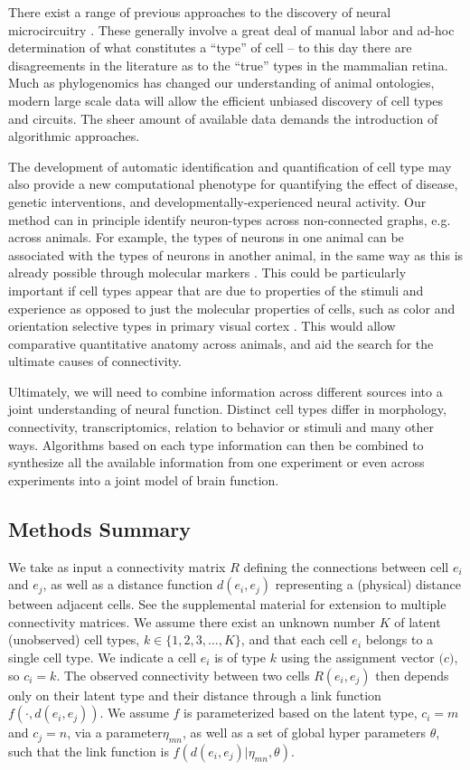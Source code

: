 \documentclass{article}
\renewcommand{\vec}[1]{\mathbf{#1}}
\begin{document}
There exist a range of previous approaches to the discovery of
neural microcircuitry . These
generally involve a great deal of manual labor and ad-hoc
determination of what constitutes a “type” of cell -- to this day
there are disagreements in the literature as to the “true” types in
the mammalian retina. Much as phylogenomics has changed our
understanding of animal ontologies, modern large scale data will allow
the efficient unbiased discovery of cell types and circuits. The sheer
amount of available data demands the introduction of algorithmic
approaches.

The development of automatic identification and quantification of cell
type may also provide a new computational phenotype for quantifying
the effect of disease, genetic interventions, and
developmentally-experienced neural activity. Our method can in
principle identify neuron-types across non-connected graphs,
e.g. across animals. For example, the types of neurons in one animal
can be associated with the types of neurons in another animal, in the
same way as this is already possible through molecular markers
\autocite{Brown2009}. This could be particularly important if cell
types appear that are due to properties of the stimuli and experience
as opposed to just the molecular properties of cells, such as color
and orientation selective types in primary visual cortex
\autocite{Sincich2005,Lennie2005}. This would allow comparative
quantitative anatomy across animals, and aid the search for the
ultimate causes of connectivity.

Ultimately, we will need to combine information across different
sources into a joint understanding of neural function. Distinct cell
types differ in morphology, connectivity, transcriptomics, relation to
behavior or stimuli and many other ways. Algorithms based on each type
information can then be combined to synthesize all the available
information from one experiment or even across experiments into a
joint model of brain function.

\subsection{Methods Summary}

We take as input a connectivity matrix $R$ defining the connections
between cell $e_i$ and $e_j$, as well as a distance function $d(e_i,
e_j)$ representing a (physical) distance between adjacent cells. See
the supplemental material for extension to multiple connectivity
matrices. We assume there exist an unknown number $K$ of latent
(unobserved) cell types, $k \in \{1, 2, 3, \dots, K\}$, and that each
cell $e_i$ belongs to a single cell type. We indicate a cell $e_i$ is
of type $k$ using the assignment vector $\vec(c)$, so $c_i = k$. The
observed connectivity between two cells $R(e_i, e_j)$ then depends
only on their latent type and their distance through a link function
$f(\cdot, d(e_i, e_j))$. We assume $f$ is parameterized based on the
latent type, $c_i=m$ and $c_j=n$, via a parameter$\eta_{mn}$, as well
as a set of global hyper parameters $\theta$, such that the link
function is $f(d(e_i, e_j) | \eta_{mn}, \theta)$. 
\end{document}
